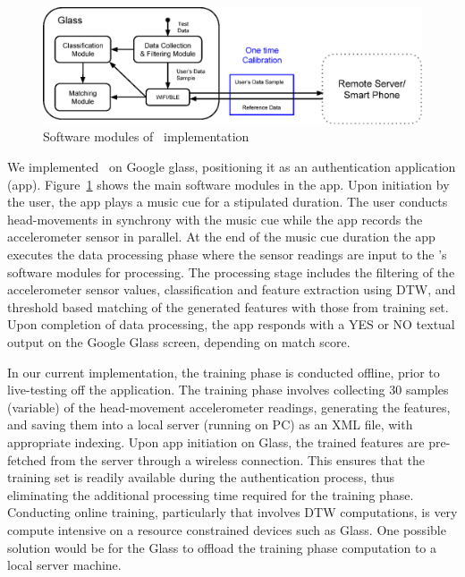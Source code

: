\begin{figure}[t]
\centering
\includegraphics [width=\columnwidth]{figure/software_arch.eps}
\caption{Software modules of \systemname~implementation}
\vspace{25 pt}
\label{fig:glass-softwarearch}
\end{figure}

We implemented \systemname~on Google glass, positioning it as an 
authentication application (app). 
Figure~\ref{fig:glass-softwarearch} shows the main software modules in the 
app. Upon initiation by the user, the app plays a music cue for a stipulated 
duration. The user conducts head-movements in synchrony with the music cue 
while the app records the accelerometer sensor in parallel. At the end of the 
music cue duration the app executes the data processing phase where the 
sensor readings are input to the \systemname's software modules for 
processing. The processing stage includes the filtering of the accelerometer 
sensor values, classification and feature extraction using DTW, and threshold 
based matching of the generated features with those from training set.
Upon completion of data processing, the app responds with a YES or NO textual 
output on the Google Glass screen, depending on match score.

In our current implementation, the training phase is conducted offline, prior 
to live-testing off the application.
The training phase involves collecting 30 samples (variable) of the 
head-movement accelerometer readings, generating the features, and saving them 
into a local server (running on PC) as an XML file, with appropriate indexing. 
Upon app initiation on Glass, the trained features are pre-fetched from 
the server through a wireless connection. This ensures that the training set 
is readily available during the authentication process, thus eliminating the 
additional processing time required for the training phase.
Conducting online training, particularly that involves DTW computations, is 
very compute intensive on a resource constrained devices such as Glass. 
One possible solution would be for the Glass to offload the 
training phase computation to a local server machine.

